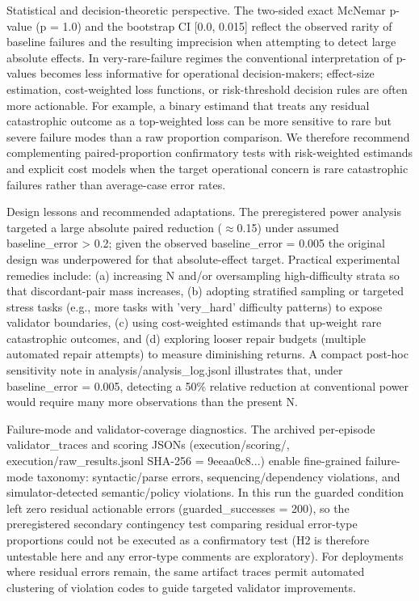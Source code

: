 \documentclass[conference]{IEEEtran}
\begin{document}
Statistical and decision-theoretic perspective. The two-sided exact McNemar p-value (p = 1.0) and the bootstrap CI [0.0, 0.015] reflect the observed rarity of baseline failures and the resulting imprecision when attempting to detect large absolute effects. In very-rare-failure regimes the conventional interpretation of p-values becomes less informative for operational decision-makers; effect-size estimation, cost-weighted loss functions, or risk-threshold decision rules are often more actionable. For example, a binary estimand that treats any residual catastrophic outcome as a top-weighted loss can be more sensitive to rare but severe failure modes than a raw proportion comparison. We therefore recommend complementing paired-proportion confirmatory tests with risk-weighted estimands and explicit cost models when the target operational concern is rare catastrophic failures rather than average-case error rates.

Design lessons and recommended adaptations. The preregistered power analysis targeted a large absolute paired reduction (\ensuremath{\approx}0.15) under assumed baseline\_error > 0.2; given the observed baseline\_error = 0.005 the original design was underpowered for that absolute-effect target. Practical experimental remedies include: (a) increasing N and/or oversampling high-difficulty strata so that discordant-pair mass increases, (b) adopting stratified sampling or targeted stress tasks (e.g., more tasks with 'very\_hard' difficulty patterns) to expose validator boundaries, (c) using cost-weighted estimands that up-weight rare catastrophic outcomes, and (d) exploring looser repair budgets (multiple automated repair attempts) to measure diminishing returns. A compact post-hoc sensitivity note in analysis/analysis\_log.jsonl illustrates that, under baseline\_error = 0.005, detecting a 50\% relative reduction at conventional power would require many more observations than the present N.

Failure-mode and validator-coverage diagnostics. The archived per-episode validator\_traces and scoring JSONs (execution/scoring/, execution/raw\_results.jsonl SHA-256 = 9eeaa0c8...) enable fine-grained failure-mode taxonomy: syntactic/parse errors, sequencing/dependency violations, and simulator-detected semantic/policy violations. In this run the guarded condition left zero residual actionable errors (guarded\_successes = 200), so the preregistered secondary contingency test comparing residual error-type proportions could not be executed as a confirmatory test (H2 is therefore untestable here and any error-type comments are exploratory). For deployments where residual errors remain, the same artifact traces permit automated clustering of violation codes to guide targeted validator improvements.
\end{document}
